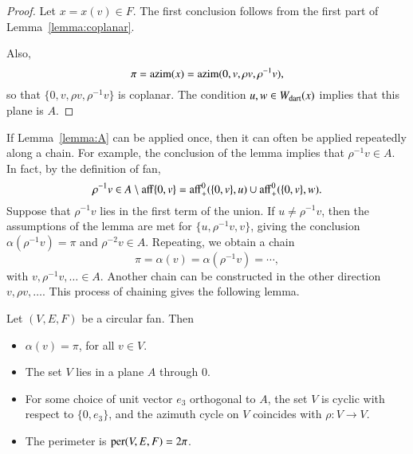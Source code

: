 \begin{proof} Let $x = x(v)\in F$.  The first conclusion follows from the first part of Lemma~\ref{lemma:coplanar}.  

Also,
$$
\pi={\operatorname{azim}}(x) = {\operatorname{azim}}(0,v,\rho v,\rho^{-1}v),
$$
so that $\{0,v,\rho v,\rho^{-1} v\}$ is coplanar.  The condition
 $u,w\in W_{\text{dart}}(x)$ implies that this plane is $A$.
\end{proof}

If Lemma~\ref{lemma:A} can be applied once, then it can often be applied repeatedly along a chain.  For example, the conclusion of the lemma implies
that $\rho^{-1} v \in A$.  In fact, by the definition of fan, 
$$\rho^{-1}v \in A \setminus {\operatorname{aff}}\{0,v\} = {\operatorname{aff}}^0_+(\{0,v\},u) \cup {\operatorname{aff}}^0_+(\{0,v\},w).$$
Suppose that $\rho^{-1} v$ lies in the first term of the union.  If $u\ne \rho^{-1}v$, then the assumptions of the lemma
are met for $\{u,\rho^{-1} v,v\}$, giving the conclusion $\alpha(\rho^{-1} v)=\pi$ and $\rho^{-2}v\in A$.  Repeating, we obtain a chain
$$
\pi=\alpha(v) = \alpha(\rho^{-1} v) = \cdots,
$$
with $v,\rho^{-1}v,\ldots\in A$.  Another chain can be constructed in the other direction $v,\rho v,\ldots$.
This process of chaining gives the following lemma.

\begin{lemma}\label{lemma:circular}
Let $(V,E,F)$ be a circular fan. Then
\begin{itemize}
\item $\alpha(v)=\pi$, for all $v\in V$.
\item The set $V$ lies in a plane $A$ through $0$.
\item For some choice of unit vector $e_3$ orthogonal to $A$, the set $V$ is cyclic with respect to
$\{0,e_3\}$, and the azimuth cycle on $V$ coincides with $\rho:V\to V$.
\item The perimeter is ${\operatorname{per}}(V,E,F) =2\pi$.
\end{itemize}
\end{lemma}


